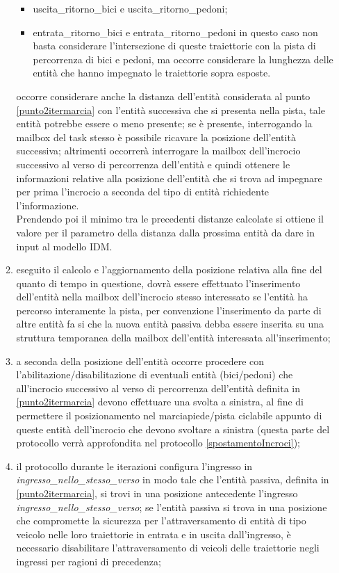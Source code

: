 \begin{enumerate}
\begin{enumerate}
\begin{itemize}
\item usci\-ta\_ri\-tor\-no\_bi\-ci e usci\-ta\_ri\-tor\-no\_pe\-do\-ni;
\item en\-tra\-ta\_ritorno\_bici e en\-tra\-ta\_ri\-tor\-no\_pe\-do\-ni in questo caso non basta considerare l'intersezione di queste traiettorie con la pista di percorrenza di bici e pedoni, ma occorre considerare la lunghezza delle entità che hanno impegnato le traiettorie sopra esposte.
\end{itemize}
occorre considerare anche la distanza dell'entità considerata al punto \ref{punto2itermarcia} con l'entità successiva che si presenta nella pista, tale entità potrebbe essere o meno presente; se è presente, interrogando la mailbox del task stesso è possibile ricavare la posizione dell'entità successiva; altrimenti occorrerà interrogare la mailbox dell'incrocio successivo al verso di percorrenza dell'entità e quindi ottenere le informazioni relative alla posizione dell'entità che si trova ad impegnare per prima l'incrocio a seconda del tipo di entità richiedente l'informazione.\\
Prendendo poi il minimo tra le precedenti distanze calcolate si ottiene il valore per il parametro della distanza dalla prossima entità da dare in input al modello \ac{IDM}.
\item eseguito il calcolo e l'aggiornamento della posizione relativa alla fine del quanto di tempo in questione, dovrà essere effettuato l'inserimento dell'entità nella mailbox dell'incrocio stesso interessato se l'entità ha percorso interamente la pista, per convenzione l'inserimento da parte di altre entità fa si che la nuova entità passiva debba essere inserita su una struttura temporanea della mailbox dell'entità interessata all'inserimento;
\item a seconda della posizione dell'entità occorre procedere con l'abilitazione/disabilitazione di eventuali entità (bici/pedoni) che all'incrocio successivo al verso di percorrenza dell'entità definita in \ref{punto2itermarcia} devono effettuare una svolta a sinistra, al fine di permettere il posizionamento nel marciapiede/pista ciclabile appunto di queste entità dell'incrocio che devono svoltare a sinistra (questa parte del protocollo verrà approfondita nel protocollo \ref{spostamentoIncroci});
\item il protocollo durante le iterazioni configura l'ingresso in \textit{ingres\-so\_nel\-lo\_stes\-so\_ver\-so} in modo tale che l'entità passiva, definita in \ref{punto2itermarcia}, si trovi in una posizione antecedente l'ingresso \textit{ingres\-so\_nel\-lo\_stes\-so\_ver\-so}; se l'entità passiva si trova in una posizione che compromette la sicurezza per l'attraversamento di entità di tipo veicolo nelle loro traiettorie in entrata e in uscita dall'ingresso, è necessario disabilitare l'attraversamento di veicoli delle traiettorie negli ingressi per ragioni di precedenza;

\end{enumerate}
\end{enumerate}
